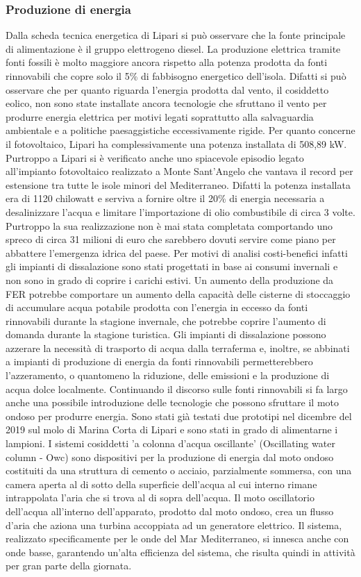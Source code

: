 \documentclass[fleqn,10pt]{SelfArx} %
\begin{document}
\subsubsection{Produzione di energia}
Dalla scheda tecnica energetica di Lipari si può osservare che la fonte principale di alimentazione
è il gruppo elettrogeno diesel. La produzione elettrica tramite fonti fossili è molto maggiore ancora
rispetto alla potenza prodotta da fonti rinnovabili che copre solo il 5\% di fabbisogno energetico dell'isola. Difatti si può osservare che per quanto riguarda
l'energia prodotta dal vento, il cosiddetto eolico, non sono state installate ancora tecnologie che 
sfruttano il vento per produrre energia elettrica per motivi legati soprattutto alla salvaguardia ambientale e a politiche paesaggistiche eccessivamente rigide. 
Per quanto concerne il fotovoltaico, Lipari ha complessivamente una potenza installata di 508,89 kW. 
Purtroppo a Lipari si è verificato anche uno spiacevole episodio legato all'impianto fotovoltaico realizzato a Monte Sant'Angelo che vantava il record per estensione tra tutte le isole minori del Mediterraneo. 
Difatti la potenza installata era di 1120 chilowatt e serviva a fornire oltre il 20\% di energia necessaria a desalinizzare l'acqua e limitare l'importazione di olio combustibile di circa 3 volte. 
Purtroppo la sua realizzazione non è mai stata completata comportando uno spreco di circa 31 milioni di euro che sarebbero dovuti servire come piano per abbattere l'emergenza idrica del paese. Per motivi di analisi costi-benefici infatti gli impianti di dissalazione sono stati progettati in base ai consumi invernali e non sono in grado di coprire i carichi estivi. 
Un aumento della produzione da FER potrebbe comportare un aumento della capacità delle cisterne di stoccaggio di accumulare acqua potabile prodotta con l'energia in eccesso da fonti rinnovabili durante la stagione invernale, che potrebbe coprire l'aumento di domanda durante la stagione turistica. 
Gli impianti di dissalazione possono azzerare la necessità di trasporto di acqua dalla terraferma e, inoltre, se abbinati a impianti di produzione di energia da fonti rinnovabili permetterebbero l'azzeramento, o quantomeno la riduzione, delle emissioni e la produzione di acqua dolce localmente. 
Continuando il discorso sulle fonti rinnovabili si fa largo anche una possibile introduzione delle tecnologie che possono sfruttare il moto ondoso per produrre energia. 
Sono stati già testati due prototipi nel dicembre del 2019
sul molo di Marina Corta di Lipari e sono stati in grado di alimentarne i lampioni. 
I sistemi cosiddetti 'a colonna d'acqua oscillante' (Oscillating water column - Owc) sono dispositivi per la produzione di energia dal moto ondoso costituiti da una struttura di cemento o acciaio, parzialmente sommersa, con una camera aperta al di sotto della superficie dell'acqua al cui interno rimane intrappolata l'aria che si trova al di sopra dell'acqua. 
Il moto oscillatorio dell'acqua all'interno 
dell'apparato, prodotto dal moto ondoso, crea un flusso d'aria che aziona una turbina accoppiata ad un generatore elettrico. 
Il sistema, realizzato specificamente per le onde del Mar Mediterraneo, si innesca anche con onde basse, garantendo un'alta efficienza del sistema, che risulta quindi in attività per gran parte della giornata.
\end{document}
